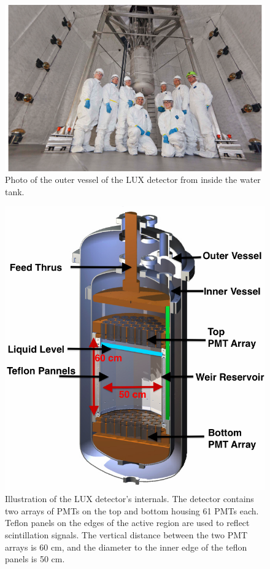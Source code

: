  \begin{figure}[h!]\centering
\includegraphics[scale=0.5]{Chapter_LUX_Det/LUX_Real.png}
\caption{Photo of the outer vessel of the LUX detector from inside the water tank.}
\label{fig:LUX_Real}
\end{figure}


 \begin{figure}[h!]\centering
\includegraphics[scale=0.5]{Chapter_LUX_Det/LUX_half_rendering_white_text.png}
\caption{Illustration of the LUX detector's internals. The detector contains two arrays of PMTs on the top and bottom housing 61 PMTs each. Teflon panels on the edges of the active region are used to reflect scintillation signals. The vertical distance between the two PMT arrays is 60 cm, and the diameter to the inner edge of the teflon panels is 50 cm. }
\label{fig:LUX_TPC}
\end{figure}

